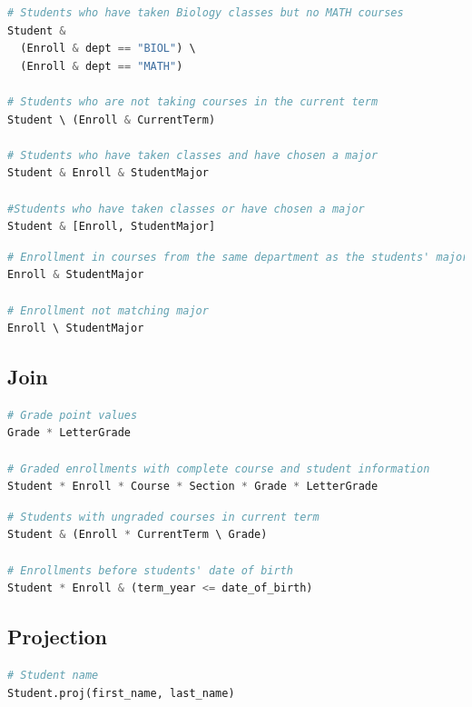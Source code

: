 \documentclass[letter,10pt]{article}
\begin{document}
\begin{lstlisting}[language=Python, caption={Composite restrictions.}, label={lst:res6}]
# Students who have taken Biology classes but no MATH courses
Student & 
  (Enroll & dept == "BIOL") \ 
  (Enroll & dept == "MATH")

# Students who are not taking courses in the current term
Student \ (Enroll & CurrentTerm)

# Students who have taken classes and have chosen a major
Student & Enroll & StudentMajor 

#Students who have taken classes or have chosen a major
Student & [Enroll, StudentMajor]
\end{lstlisting}

\begin{lstlisting}[language=Python, caption={Avoiding unintended restrictions.}, label={lst:res7}]
# Enrollment in courses from the same department as the students' major
Enroll & StudentMajor

# Enrollment not matching major 
Enroll \ StudentMajor 
\end{lstlisting}

\subsection{Join}
\begin{lstlisting}[language=Python, caption={Combining entities.}, label={lst:join1}]
# Grade point values
Grade * LetterGrade

# Graded enrollments with complete course and student information
Student * Enroll * Course * Section * Grade * LetterGrade
\end{lstlisting}

\begin{lstlisting}[language=Python, caption={Join in expressions.}, label={lst:join2}]
# Students with ungraded courses in current term
Student & (Enroll * CurrentTerm \ Grade)

# Enrollments before students' date of birth
Student * Enroll & (term_year <= date_of_birth)
\end{lstlisting}

\subsection{Projection}
\begin{lstlisting}[language=Python, caption={Selecting  attributes.}, label={lst:select}]
# Student name
Student.proj(first_name, last_name)
\end{lstlisting}
\end{document}
